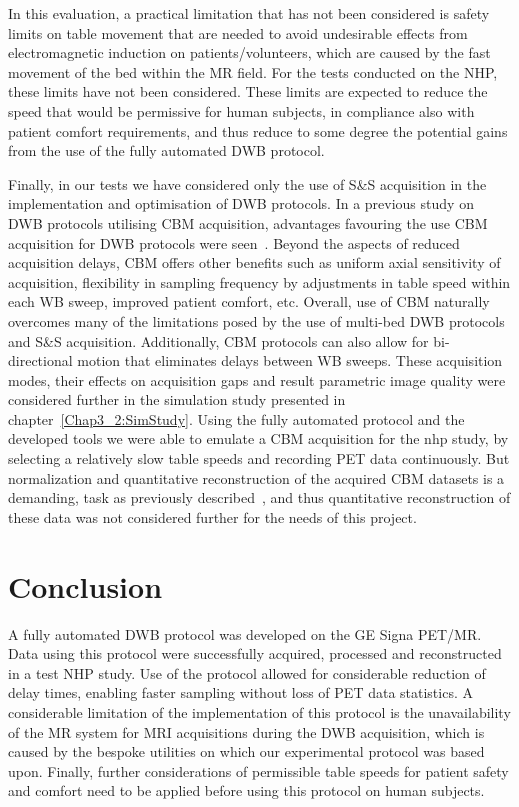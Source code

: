 In this evaluation, a practical limitation that has not been considered is safety limits on table movement that are needed to avoid undesirable effects from electromagnetic induction on patients/volunteers, which are caused by the fast movement of the bed within the MR field. For the tests conducted on the NHP, these limits have not been considered. These limits are expected to reduce the speed that would be permissive for human subjects, in compliance also with patient comfort requirements, and thus reduce to some degree the potential gains from the use of the fully automated DWB protocol. 

Finally, in our tests we have considered only the use of S\&S acquisition in the implementation and optimisation of DWB protocols. 
In a previous study on DWB protocols utilising CBM acquisition, advantages favouring the use CBM acquisition for DWB protocols were seen~\cite{Karakatsanis2016a}. Beyond the aspects of reduced acquisition delays, CBM offers other benefits such as uniform axial sensitivity of acquisition, flexibility in sampling frequency by adjustments in table speed within each WB sweep, improved patient comfort, etc. 
Overall, use of CBM naturally overcomes many of the limitations posed by the use of multi-bed DWB protocols and S\&S acquisition. 
Additionally, CBM protocols can also allow for bi-directional motion that eliminates delays between WB sweeps. 
These acquisition modes, their effects on acquisition gaps and result parametric image quality were considered further in the simulation study presented in chapter~\ref{Chap3_2:SimStudy}.
Using the fully automated protocol and the developed tools we were able to emulate a CBM acquisition for the \gls{nhp} study, by selecting a relatively slow table speeds and recording PET data continuously. But normalization and quantitative reconstruction of the acquired CBM datasets is a demanding, task as previously described~\cite{Panin2014}, and thus quantitative reconstruction of these data was not considered further for the needs of this project.

\section{Conclusion}
A fully automated DWB protocol was developed on the GE Signa PET/MR. Data using this protocol were successfully acquired, processed and reconstructed in a test NHP study.
Use of the protocol allowed for considerable reduction of delay times, enabling faster sampling without loss of PET data statistics.
A considerable limitation of the implementation of this protocol is the unavailability of the MR system for MRI acquisitions during the DWB acquisition, which is caused by the bespoke utilities on which our experimental protocol was based upon.
Finally, further considerations of permissible table speeds for patient safety and comfort need to be applied before using this protocol on human subjects.

